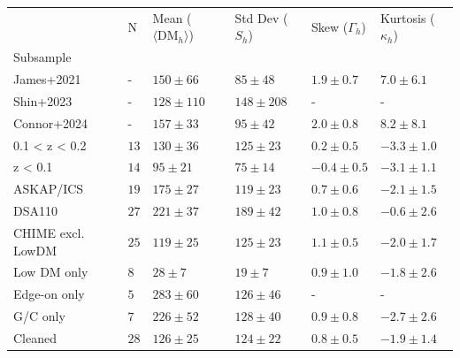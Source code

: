 \begin{tabular}{llllll}
\toprule
 & N & Mean ($\langle\textrm{DM}_h \rangle$) & Std Dev ($S_h$) & Skew ($\Gamma_h$) & Kurtosis ($\kappa_h$) \\
Subsample &  &  &  &  &  \\
\midrule
James+2021 & - & $150 \pm 66$ & $85 \pm 48$ & $1.9 \pm 0.7$ & $7.0 \pm 6.1$ \\
Shin+2023 & - & $128 \pm 110$ & $148 \pm 208$ & - & - \\
Connor+2024 & - & $157 \pm 33$ & $95 \pm 42$ & $2.0 \pm 0.8$ & $8.2 \pm 8.1$ \\
0.1 < z < 0.2  & $13$ & $130 \pm 36$ & $125 \pm 23$ & $0.2 \pm 0.5$ & $-3.3 \pm 1.0$ \\
z < 0.1  & $14$ & $95 \pm 21$ & $75 \pm 14$ & $-0.4 \pm 0.5$ & $-3.1 \pm 1.1$ \\
ASKAP/ICS  & $19$ & $175 \pm 27$ & $119 \pm 23$ & $0.7 \pm 0.6$ & $-2.1 \pm 1.5$ \\
DSA110  & $27$ & $221 \pm 37$ & $189 \pm 42$ & $1.0 \pm 0.8$ & $-0.6 \pm 2.6$ \\
CHIME excl. LowDM  & $25$ & $119 \pm 25$ & $125 \pm 23$ & $1.1 \pm 0.5$ & $-2.0 \pm 1.7$ \\
Low DM only  & $8$ & $28 \pm 7$ & $19 \pm 7$ & $0.9 \pm 1.0$ & $-1.8 \pm 2.6$ \\
Edge-on only  & $5$ & $283 \pm 60$ & $126 \pm 46$ & - & - \\
G/C only  & $7$ & $226 \pm 52$ & $128 \pm 40$ & $0.9 \pm 0.8$ & $-2.7 \pm 2.6$ \\
Cleaned  & $28$ & $126 \pm 25$ & $124 \pm 22$ & $0.8 \pm 0.5$ & $-1.9 \pm 1.4$ \\
\bottomrule
\end{tabular}
